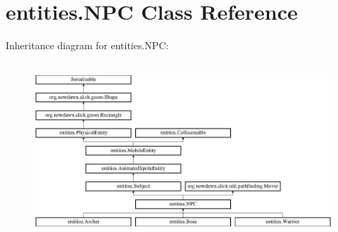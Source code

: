 \hypertarget{classentities_1_1_n_p_c}{}\section{entities.\+N\+PC Class Reference}
\label{classentities_1_1_n_p_c}
Inheritance diagram for entities.\+N\+PC\+:\begin{figure}[H]
\begin{center}
\leavevmode
\includegraphics[height=6.666667cm]{classentities_1_1_n_p_c}
\end{center}
\end{figure}
